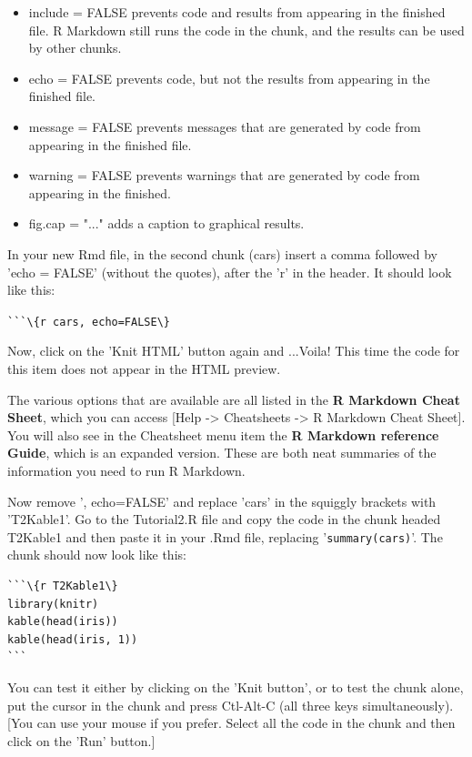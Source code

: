 \documentclass[titlepage]{book}\usepackage{knitr}
\begin{document}
\begin{itemize}

\item{include = FALSE prevents code and results from appearing in the finished file. R Markdown still runs the code in the chunk, and the results can be used by other chunks.}
\item{echo = FALSE prevents code, but not the results from appearing in the finished file.}
\item{message = FALSE prevents messages that are generated by code from appearing in the finished file.}
\item{warning = FALSE prevents warnings that are generated by code from appearing in the finished.}
\item{fig.cap = "..." adds a caption to graphical results.}

\end{itemize}

In your new Rmd file, in the second chunk (cars) insert a comma followed by 'echo = FALSE' (without the quotes), after the 'r' in the header. It should look like this:

\verb+```\{r cars, echo=FALSE\}+

Now, click on the 'Knit HTML' button again and ...Voila! This time the code for this item does not appear in the HTML preview. 

The various options that are available are all listed in the \textbf{R Markdown Cheat Sheet}, which you can access [Help ->  Cheatsheets -> R Markdown Cheat Sheet]. You will also see in the Cheatsheet menu item the \textbf{R Markdown reference Guide}, which is an expanded version.  These are both neat summaries of the information you need to run R Markdown.


Now remove ', echo=FALSE' and replace 'cars' in the squiggly brackets with 'T2Kable1'. Go to the Tutorial2.R file and copy the code in the chunk headed T2Kable1 and then paste it in your .Rmd file, replacing '\texttt{summary(cars)}'. The chunk should now look like this:

\begin{verbatim}
```\{r T2Kable1\}
library(knitr)
kable(head(iris))
kable(head(iris, 1))
```
\end{verbatim}




You can test it either by clicking on the 'Knit button', or to test the chunk alone, put the cursor in the chunk and press Ctl-Alt-C (all three keys simultaneously). [You can use your mouse if you prefer. Select all the code in the chunk and then click on the  'Run' button.]
\end{document}
